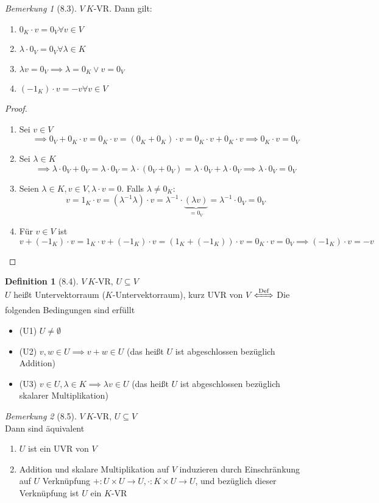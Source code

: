 \documentclass[a4paper]{scrartcl}
\DeclareMathOperator{\Forall}{\forall}
\theoremstyle{definition}
\newtheorem{defn}{Definition}
\theoremstyle{plain}
\theoremstyle{plain}
\theoremstyle{remark}
\newtheorem{remark}{Bemerkung}
\theoremstyle{remark}
\theoremstyle{remark}
\theoremstyle{remark}
\theoremstyle{remark}
\begin{document}
\begin{remark}[8.3]
$V~K$-VR. Dann gilt:
\begin{enumerate}
\item $0_K \cdot v = 0_V \Forall v\in V$
\item $\lambda \cdot 0_V = 0_V \Forall \lambda\in K$
\item $\lambda v = 0_V \implies \lambda = 0_K \vee v = 0_V$
\item $(-1_K)\cdot v = -v \Forall v\in V$
\end{enumerate}
\end{remark}
\begin{proof}
\begin{enumerate}
\item Sei $v \in V$
     \[\implies 0_V + 0_K \cdot v = 0_K \cdot v = (0_K + 0_K)\cdot v = 0_K\cdot v + 0_K \cdot v \implies 0_K \cdot v = 0_V\]
\item Sei $\lambda \in K$
     \[\implies \lambda \cdot 0_V + 0_V = \lambda \cdot 0_V = \lambda \cdot (0_V + 0_V) = \lambda\cdot 0_V + \lambda \cdot 0_V \implies \lambda \cdot 0_V = 0_V\]
\item Seien $\lambda \in K, v\in V, \lambda\cdot v = 0$. Falls $\lambda \neq 0_K:$
     \[v = 1_K \cdot v = (\lambda^{-1} \lambda)\cdot v = \lambda^{-1}\cdot \underbrace{(\lambda v)}_{= 0_V} = \lambda^{-1} \cdot 0_V = 0_V\]
\item Für $v\in V$ ist
\[v + (-1_K) \cdot v = 1_K \cdot v + (-1_K)\cdot v = (1_K + (-1_K))\cdot v = 0_K \cdot v = 0_V \implies (-1_K)\cdot v = -v\]
\end{enumerate}
\end{proof}
\begin{defn}[8.4]
$V~K$-VR, $U\subseteq V$ \\
  $U$ heißt Untervektorraum ($K$-Untervektorraum), kurz UVR von $V$ $\xLeftrightarrow{\text{Def}}$ Die folgenden Bedingungen sind erfüllt
\begin{itemize}
\item (U1) $U\neq \emptyset$
\item (U2) $v,w \in U \implies v + w \in U$ \hfill (das heißt $U$ ist abgeschlossen bezüglich Addition)
\item (U3) $v\in U, \lambda \in K \implies \lambda v \in U$ \hfill (das heißt $U$ ist abgeschlossen bezüglich skalarer Multiplikation)
\end{itemize}
\end{defn}
\begin{remark}[8.5]
$V~K$-VR, $U\subseteq V$ \\
  Dann sind äquivalent
\begin{enumerate}
\item $U$ ist ein UVR von $V$
\item Addition und skalare Multiplikation auf $V$ induzieren durch Einschränkung auf $U$ Verknüpfung $+: U\times U\to U, \cdot:K\times U \to U$, und bezüglich dieser Verknüpfung ist $U$ ein $K$-VR
\end{enumerate}
\end{remark}
\end{document}
